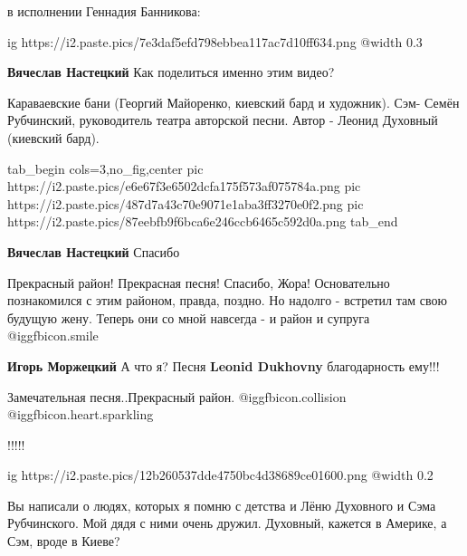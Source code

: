  
 
 
 
 
\zzSecCmt

\begin{itemize} %
в исполнении Геннадия Банникова:

\ifcmt
  ig https://i2.paste.pics/7e3daf5efd798ebbea117ac7d10ff634.png
  @width 0.3
\fi

\textbf{Вячеслав Настецкий} Как поделиться именно этим видео?


Караваевские бани (Георгий Майоренко, киевский бард и художник). Сэм- Семён
Рубчинский, руководитель театра авторской песни. Автор - Леонид Духовный
(киевский бард).


\ifcmt
  tab_begin cols=3,no_fig,center
		 pic https://i2.paste.pics/e6e67f3e6502dcfa175f573af075784a.png
		 pic https://i2.paste.pics/487d7a43c70e9071e1aba3ff3270e0f2.png
		 pic https://i2.paste.pics/87eebfb9f6bca6e246ccb6465c592d0a.png
  tab_end
\fi

\textbf{Вячеслав Настецкий} Спасибо

Прекрасный район! Прекрасная песня!
Спасибо, Жора!
Основательно познакомился с этим районом, правда, поздно. Но надолго - встретил там свою будущую жену. Теперь они со мной навсегда - и район и супруга  @igg{fbicon.smile} 

\textbf{Игорь Моржецкий} А что я? Песня \textbf{Leonid Dukhovny} благодарность ему!!!

Замечательная песня..Прекрасный район. @igg{fbicon.collision}  @igg{fbicon.heart.sparkling} 

!!!!!


\ifcmt
  ig https://i2.paste.pics/12b260537dde4750bc4d38689ce01600.png
  @width 0.2
\fi


Вы написали о людях, которых я помню с детства и Лёню Духовного и Сэма
Рубчинского. Мой дядя с ними очень дружил. Духовный, кажется в Америке, а Сэм, вроде
в Киеве?



\end{itemize}
